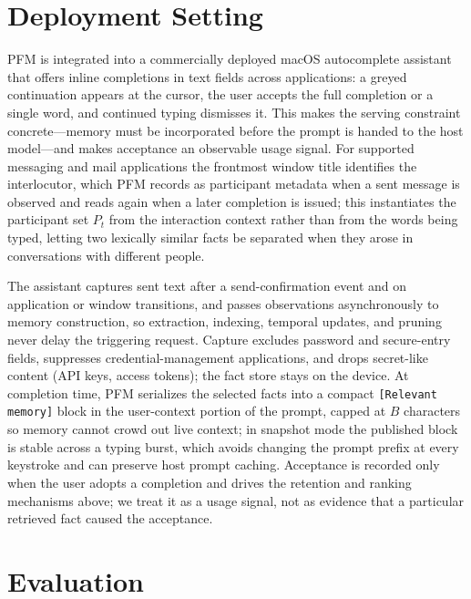 \documentclass[letterpaper]{article} %
\begin{document}
\section{Deployment Setting}

PFM is integrated into a commercially deployed macOS autocomplete assistant that offers inline completions in text fields across applications: a greyed continuation appears at the cursor, the user accepts the full completion or a single word, and continued typing dismisses it. This makes the serving constraint concrete---memory must be incorporated before the prompt is handed to the host model---and makes acceptance an observable usage signal. For supported messaging and mail applications the frontmost window title identifies the interlocutor, which PFM records as participant metadata when a sent message is observed and reads again when a later completion is issued; this instantiates the participant set $P_t$ from the interaction context rather than from the words being typed, letting two lexically similar facts be separated when they arose in conversations with different people.

The assistant captures sent text after a send-confirmation event and on application or window transitions, and passes observations asynchronously to memory construction, so extraction, indexing, temporal updates, and pruning never delay the triggering request. Capture excludes password and secure-entry fields, suppresses credential-management applications, and drops secret-like content (API keys, access tokens); the fact store stays on the device. At completion time, PFM serializes the selected facts into a compact \texttt{[Relevant memory]} block in the user-context portion of the prompt, capped at $B$ characters so memory cannot crowd out live context; in snapshot mode the published block is stable across a typing burst, which avoids changing the prompt prefix at every keystroke and can preserve host prompt caching. Acceptance is recorded only when the user adopts a completion and drives the retention and ranking mechanisms above; we treat it as a usage signal, not as evidence that a particular retrieved fact caused the acceptance.

\section{Evaluation}
\end{document}

